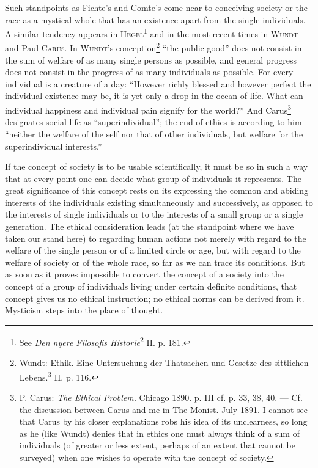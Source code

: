 \documentclass[12pt,a4paper,openany]{book}
\newcommand{\opage}[1]{\marginnote{\footnotesize\textit{[#1]}}}
\begin{document}
Such standpoints as Fichte's and Comte's come near to conceiving society or the race as a mystical whole that
has an existence apart from the single individuals. A similar tendency appears in \textsc{Hegel}\footnote[1]{See
\textit{Den nyere Filosofis Historie}\textsuperscript{2} II. p. 181.} and in the most recent times in
\textsc{Wundt} and Paul \textsc{Carus}. In \textsc{Wundt}'s conception\footnote[2]{Wundt: Ethik. Eine
Untersuchung der Thatsachen und Gesetze des sittlichen Lebens.\textsuperscript{3} II. p. 116.} ``the public
good'' does not consist in the sum of welfare of as many single persons as possible, and general progress does
not consist in the progress of as many individuals as possible. For every individual is a creature of a day:
``However richly blessed and however perfect the individual existence may be, it is yet only a drop in the
ocean of life. What can individual happiness and individual pain signify for the world?'' And
Carus\footnote[3]{P. Carus: \textit{The Ethical Problem.} Chicago 1890. p. III cf. p. 33, 38, 40. --- Cf. the
discussion between Carus and me in The Monist. July 1891. I cannot see that Carus by his closer explanations
robs his idea of its unclearness, so long as he (like Wundt) denies that in ethics one must always think of a
sum of individuals (of greater or less extent, perhaps of an extent that cannot be surveyed) when one wishes to
operate with the concept of society.} designates social life as ``superindividual''; the end of ethics is
according to him ``neither the welfare of the self nor that of other individuals, but welfare for the
superindividual interests.''

If the concept of society is to be usable scientifically, it must be so in such a way that at every point one
can decide what group of individuals it represents. The great significance of this concept rests on its
expressing the common and abiding interests of the individuals existing simultaneously and successively, as
opposed to the interests of single individuals or to the interests of a small group or a single generation.
The ethical consideration leads (at the standpoint where we have taken our stand here) to regarding human
actions not merely with regard to the welfare of the single person or of a limited circle or age, but with
regard to the welfare of society or of the whole
\opage{169}race, so far as we can trace its conditions. But as soon as it proves impossible to convert the concept of
a society into the concept of a group of individuals living under certain definite conditions, that concept
gives us no ethical instruction; no ethical norms can be derived from it. Mysticism steps into the place of
thought.
\end{document}

